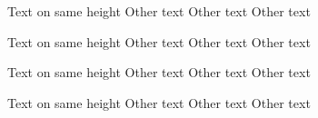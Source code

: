 \documentclass{kapital}
\begin{document}
  \tableofcontents*
  \mainmatter


  Text on same height
  \clearpage
  Other text
    \clearpage
  Other text
    \clearpage
  Other text


  Text on same height
  \clearpage
  Other text
    \clearpage
  Other text
    \clearpage
  Other text



  Text on same height
  \clearpage
  Other text
    \clearpage
  Other text
    \clearpage
  Other text

  

  Text on same height
  \clearpage
  Other text
    \clearpage
  Other text
    \clearpage
  Other text








\end{document}
